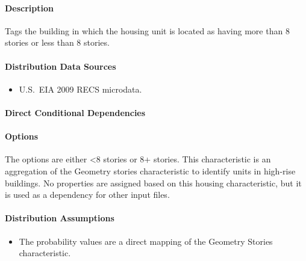 \paragraph{Description}
% 
Tags the building in which the housing unit is located as having more than 8 stories or less than 8 stories.

\paragraph{Distribution Data Sources}
% 
\begin{itemize}
    \item U.S.~EIA 2009 RECS microdata.
\end{itemize}

\paragraph{Direct Conditional Dependencies}


\paragraph{Options}
The options are either <8 stories or 8+ stories. This characteristic is an aggregation of the Geometry stories characteristic to identify units in high-rise buildings. No properties are assigned based on this housing characteristic, but it is used as a dependency for other input files.



\paragraph{Distribution Assumptions}
% 
\begin{itemize}
    \item The probability values are a direct mapping of the Geometry Stories characteristic.
\end{itemize}
